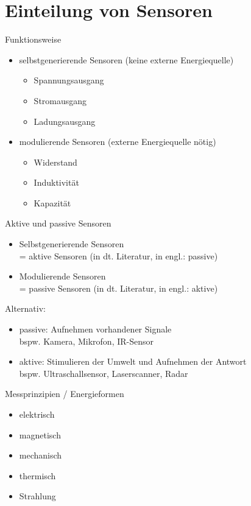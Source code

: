 \section{Einteilung von Sensoren}
\begin{anumerate}
\item Funktionsweise
\begin{itemize}
\item selbstgenerierende Sensoren (keine externe Energiequelle)
\begin{itemize}
\item Spannungsausgang
\item Stromausgang
\item Ladungsausgang
\end{itemize}
\item modulierende Sensoren (externe Energiequelle nötig)
\begin{itemize}
\item Widerstand
\item Induktivität
\item Kapazität
\end{itemize}
\end{itemize}
\item Aktive und passive Sensoren
\begin{itemize}
\item Selbstgenerierende Sensoren\\
= aktive Sensoren (in dt. Literatur, in engl.: passive)
\item Modulierende Sensoren\\
= passive Sensoren (in dt. Literatur, in engl.: aktive)
\end{itemize}
Alternativ:
\begin{itemize}
\item passive: Aufnehmen vorhandener Signale\\
bspw. Kamera, Mikrofon, IR-Sensor
\item aktive: Stimulieren der Umwelt und Aufnehmen der Antwort\\
bspw. Ultraschallsensor, Laserscanner, Radar
\end{itemize}
\item Messprinzipien / Energieformen
\begin{itemize}
\item elektrisch
\item magnetisch
\item mechanisch
\item thermisch
\item Strahlung

\end{itemize}
\end{anumerate}
